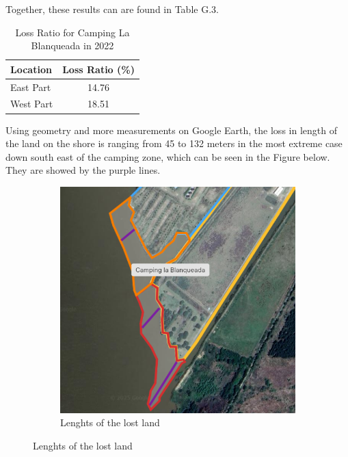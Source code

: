 Together, these results can are found in Table G.3.

\begin{table}[h]
\centering
\caption{Loss Ratio for Camping La Blanqueada in 2022}
\label{tab:LossRatio}
\begin{tabular}{l c}
\toprule
\textbf{Location} & \textbf{Loss Ratio (\%)} \\
\midrule
East Part & 14.76 \\
West Part & 18.51 \\
\bottomrule
\end{tabular}
\end{table}

Using geometry and more measurements on Google Earth, the loss in length of the land on the shore is ranging from 45 to 132 meters in the most extreme case down south east of the camping zone, which can be seen in the Figure below. They are showed by the purple lines.

\begin{figure}[H]
    \centering
    \begin{subfigure}[b]{0.48\textwidth}
        \includegraphics[width=\linewidth, height =6
        cm]{figures/appendix-g/length.png}
        \caption{Lenghts of the lost land}
        \label{fig:second}
    \end{subfigure}
\end{figure}
